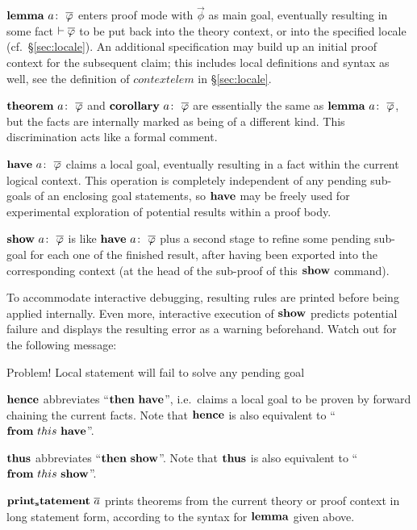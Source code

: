 \begin{descr}
  
\item [$\LEMMA{a}{\vec\phi}$] enters proof mode with $\vec\phi$ as main goal,
  eventually resulting in some fact $\vdash \overline{\varphi}$ to be put back into the
  theory context, or into the specified locale (cf.\ \S\ref{sec:locale}).  An
  additional  specification may build up an initial proof
  context for the subsequent claim; this includes local definitions and syntax
  as well, see the definition of $contextelem$ in \S\ref{sec:locale}.
  
\item [$\THEOREM{a}{\vec\phi}$ and $\COROLLARY{a}{\vec\phi}$] are essentially
  the same as $\LEMMA{a}{\vec\phi}$, but the facts are internally marked as
  being of a different kind.  This discrimination acts like a formal comment.
  
\item [$\HAVE{a}{\vec\phi}$] claims a local goal, eventually resulting in a
  fact within the current logical context.  This operation is completely
  independent of any pending sub-goals of an enclosing goal statements, so
  ${\mathord{\mathbf{have}}}$ may be freely used for experimental exploration of potential
  results within a proof body.
  
\item [$\SHOW{a}{\vec\phi}$] is like $\HAVE{a}{\vec\phi}$ plus a second stage
  to refine some pending sub-goal for each one of the finished result, after
  having been exported into the corresponding context (at the head of the
  sub-proof of this ${\mathord{\mathbf{show}}}$ command).
  
  To accommodate interactive debugging, resulting rules are printed before
  being applied internally.  Even more, interactive execution of ${\mathord{\mathbf{show}}}$
  predicts potential failure and displays the resulting error as a warning
  beforehand.  Watch out for the following message:

  \begin{ttbox}
  Problem! Local statement will fail to solve any pending goal
  \end{ttbox}
  
\item [${\mathord{\mathbf{hence}}}$] abbreviates ``${\mathord{\mathbf{then}}}~{\mathord{\mathbf{have}}}$'', i.e.\ claims a local
  goal to be proven by forward chaining the current facts.  Note that
  ${\mathord{\mathbf{hence}}}$ is also equivalent to ``${\mathord{\mathbf{from}}}~this~{\mathord{\mathbf{have}}}$''.
  
\item [${\mathord{\mathbf{thus}}}$] abbreviates ``${\mathord{\mathbf{then}}}~{\mathord{\mathbf{show}}}$''.  Note that ${\mathord{\mathbf{thus}}}$
  is also equivalent to ``${\mathord{\mathbf{from}}}~this~{\mathord{\mathbf{show}}}$''.
  
\item [${\mathord{\mathbf{print_statement}}}~\overline{a}$] prints theorems from
  the current theory or proof context in long statement form,
  according to the syntax for ${\mathord{\mathbf{lemma}}}$ given above.

\end{descr}

